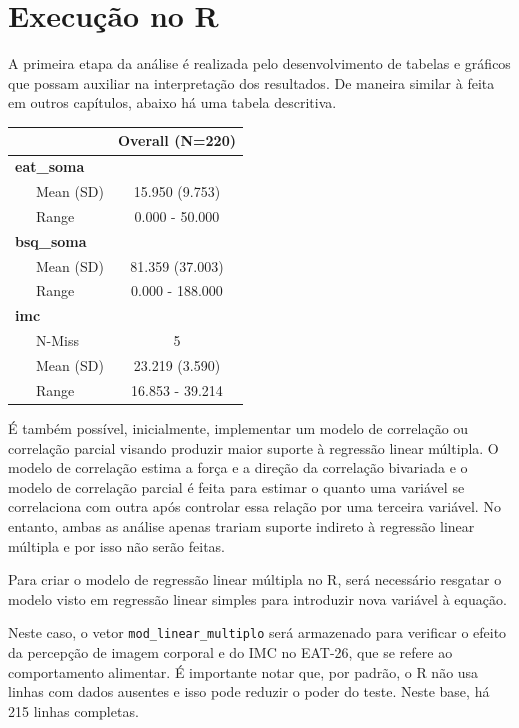 \documentclass[
]{book}
\newenvironment{Shaded}{\begin{snugshade}}{\end{snugshade}}
\newcommand{\KeywordTok}[1]{\textcolor[rgb]{0.13,0.29,0.53}{\textbf{#1}}}
\newcommand{\NormalTok}[1]{#1}
\newcommand{\OperatorTok}[1]{\textcolor[rgb]{0.81,0.36,0.00}{\textbf{#1}}}
\newcommand{\StringTok}[1]{\textcolor[rgb]{0.31,0.60,0.02}{#1}}
\begin{document}
\hypertarget{execuuxe7uxe3o-no-r-15}{%
\section{Execução no R}\label{execuuxe7uxe3o-no-r-15}}

A primeira etapa da análise é realizada pelo desenvolvimento de tabelas e gráficos que possam auxiliar na interpretação dos resultados. De maneira similar à feita em outros capítulos, abaixo há uma tabela descritiva.

\begin{Shaded}
\end{Shaded}

\begin{longtable}[]{@{}lc@{}}
\toprule
& Overall (N=220)\tabularnewline
\midrule
\endhead
\textbf{eat\_soma} &\tabularnewline
~~~Mean (SD) & 15.950 (9.753)\tabularnewline
~~~Range & 0.000 - 50.000\tabularnewline
\textbf{bsq\_soma} &\tabularnewline
~~~Mean (SD) & 81.359 (37.003)\tabularnewline
~~~Range & 0.000 - 188.000\tabularnewline
\textbf{imc} &\tabularnewline
~~~N-Miss & 5\tabularnewline
~~~Mean (SD) & 23.219 (3.590)\tabularnewline
~~~Range & 16.853 - 39.214\tabularnewline
\bottomrule
\end{longtable}

É também possível, inicialmente, implementar um modelo de correlação ou correlação parcial visando produzir maior suporte à regressão linear múltipla. O modelo de correlação estima a força e a direção da correlação bivariada e o modelo de correlação parcial é feita para estimar o quanto uma variável se correlaciona com outra após controlar essa relação por uma terceira variável. No entanto, ambas as análise apenas trariam suporte indireto à regressão linear múltipla e por isso não serão feitas.

Para criar o modelo de regressão linear múltipla no R, será necessário resgatar o modelo visto em regressão linear simples para introduzir nova variável à equação.

Neste caso, o vetor \texttt{mod\_linear\_multiplo} será armazenado para verificar o efeito da percepção de imagem corporal e do IMC no EAT-26, que se refere ao comportamento alimentar. É importante notar que, por padrão, o R não usa linhas com dados ausentes e isso pode reduzir o poder do teste. Neste base, há 215 linhas completas.
\end{document}
